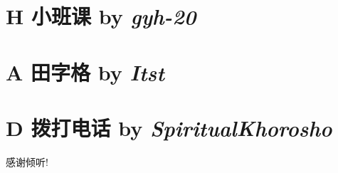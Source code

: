 \documentclass[dvipsnames]{ctexbeamer}
\begin{document}
\section{H 小班课 by \itshape gyh-20}






\section{A 田字格 by \itshape Itst}


\section{D 拨打电话 by \itshape SpiritualKhorosho}



\begin{frame}{}
    \begin{center}
        \Large 感谢倾听!
    \end{center}
\end{frame}
\end{document}
